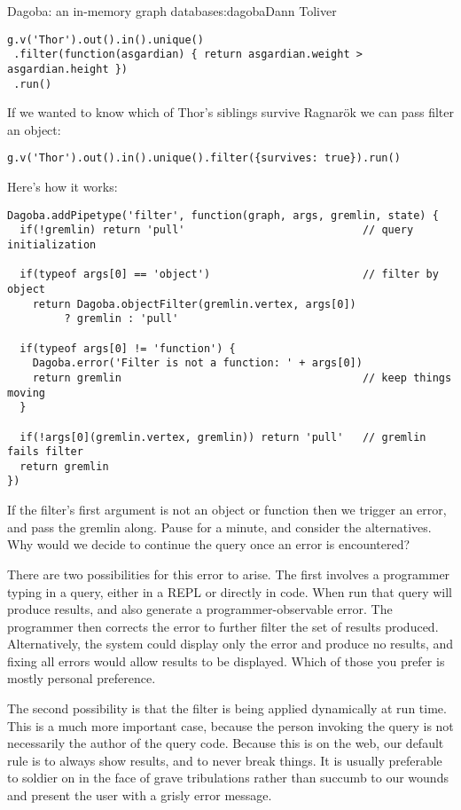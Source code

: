 \begin{aosachapter}{Dagoba: an in-memory graph database}{s:dagoba}{Dann Toliver}
\begin{verbatim}
g.v('Thor').out().in().unique()
 .filter(function(asgardian) { return asgardian.weight > asgardian.height })
 .run()
\end{verbatim}

If we wanted to know which of Thor's siblings survive Ragnarök we can
pass filter an object:

\begin{verbatim}
g.v('Thor').out().in().unique().filter({survives: true}).run()
\end{verbatim}

Here's how it works:

\begin{verbatim}
Dagoba.addPipetype('filter', function(graph, args, gremlin, state) {
  if(!gremlin) return 'pull'                            // query initialization

  if(typeof args[0] == 'object')                        // filter by object
    return Dagoba.objectFilter(gremlin.vertex, args[0]) 
         ? gremlin : 'pull'

  if(typeof args[0] != 'function') {
    Dagoba.error('Filter is not a function: ' + args[0]) 
    return gremlin                                      // keep things moving
  }

  if(!args[0](gremlin.vertex, gremlin)) return 'pull'   // gremlin fails filter 
  return gremlin
})
\end{verbatim}

If the filter's first argument is not an object or function then we
trigger an error, and pass the gremlin along. Pause for a minute, and
consider the alternatives. Why would we decide to continue the query
once an error is encountered?

There are two possibilities for this error to arise. The first involves
a programmer typing in a query, either in a REPL or directly in code.
When run that query will produce results, and also generate a
programmer-observable error. The programmer then corrects the error to
further filter the set of results produced. Alternatively, the system
could display only the error and produce no results, and fixing all
errors would allow results to be displayed. Which of those you prefer is
mostly personal preference.

The second possibility is that the filter is being applied dynamically
at run time. This is a much more important case, because the person
invoking the query is not necessarily the author of the query code.
Because this is on the web, our default rule is to always show results,
and to never break things. It is usually preferable to soldier on in the
face of grave tribulations rather than succumb to our wounds and present
the user with a grisly error message.


\end{aosachapter}
